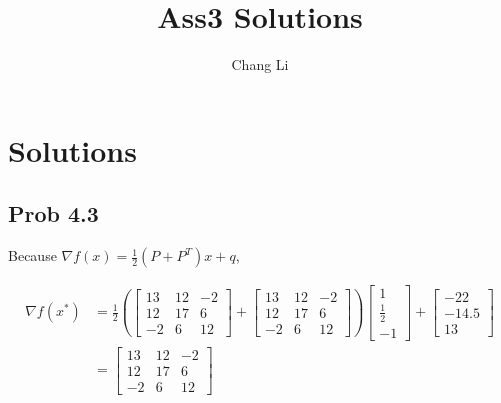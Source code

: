 \message{ !name(ass3_ChangLi.tex)}\documentclass[10pt,a4paper]{article}
\begin{document}

\title{Ass3 Solutions}
\author{Chang Li}
\maketitle

\section{Solutions}

\subsection{Prob 4.3}
Because $\nabla f(x) = \frac{1}{2}(P+P^T)x + q$,

\begin{align*}
  \nabla f(x^*) &=\frac{1}{2}(
                  \begin{bmatrix}
                    13 & 12 & -2\\
                    12 & 17 & 6\\
                    -2 & 6 & 12
                  \end{bmatrix}
                             +
                             \begin{bmatrix}
                               13 & 12 & -2\\
                               12 & 17 & 6\\
                               -2 & 6 & 12
                             \end{bmatrix})
                                        \begin{bmatrix}
                                          1\\
                                          \frac{1}{2}\\
                                          -1
                                        \end{bmatrix} +
  \begin{bmatrix}
    -22\\
    -14.5\\
    13
  \end{bmatrix}\\
                &=
                  \begin{bmatrix}
                    13 & 12 & -2\\
                    12 & 17 & 6\\
                    -2 & 6 & 12

\end{bmatrix}
\end{align*}
\end{document}
